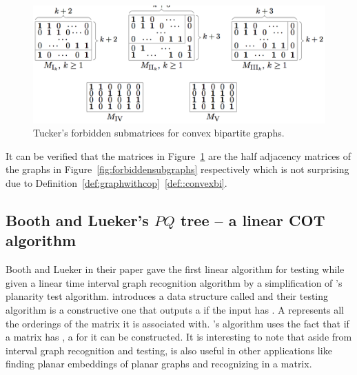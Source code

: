 \begin{figure}[htbp]
  \centering
  \includegraphics[scale=0.35]{../img/tuckersforbiddensubmatrices.png}  
  \caption[\figtabsize Tucker's forbidden submatrices]{\figtabsize Tucker's
    forbidden submatrices for convex bipartite graphs. } 
  \label{fig:forbiddensubmatrices}
\end{figure}

It can be verified that the matrices in
Figure~\ref{fig:forbiddensubmatrices} are the half adjacency matrices
of the graphs in Figure~\ref{fig:forbiddensubgraphs} respectively
which is not surprising due to
Definition~\ref{def:graphwithcop}~\ref{def::convexbi}.

\subsection{Booth and Lueker's $PQ$ tree -- a linear COT algorithm}

Booth and Lueker in their paper \cite{bl76} gave the first linear
algorithm for \cop testing while given a linear time interval graph
recognition algorithm by a simplification of 's planarity test algorithm.
%
\cite{bl76} introduces a data structure called \PQtree and their \COP
testing algorithm is a constructive one that outputs a \PQtree if the
input has \COP. A \PQtree represents all the \COP orderings of the
matrix it is associated with. \cite{bl76}'s algorithm uses the fact
that if a matrix has \COP, a \PQtree for it can be constructed. It is
interesting to note that aside from interval graph recognition and
\COP testing, \PQtree is also useful in other applications like
finding planar embeddings of planar graphs \cite{lec67,mcc04} and
recognizing \CROP in a matrix.

